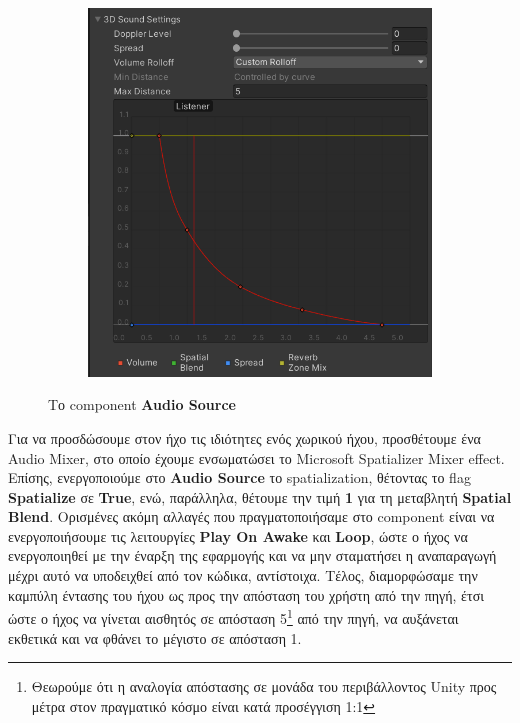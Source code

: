 \begin{figure}[!h]
\begin{subfigure}{0.5\textwidth}
        \includegraphics[width=0.8\linewidth]{images/develop_AudioSourceTwo.png}
        \caption{}
    \end{subfigure}%
    \caption{Το component \textbf{Audio Source}}\label{fig:developAudioSource}
\end{figure}

Για να προσδώσουμε στον ήχο τις ιδιότητες ενός χωρικού ήχου, προσθέτουμε ένα Audio Mixer, στο οποίο έχουμε ενσωματώσει το Microsoft Spatializer Mixer effect. Επίσης, ενεργοποιούμε στο \textbf{Audio Source} το spatialization, θέτοντας το flag \textbf{Spatialize} σε \textbf{True}, ενώ, παράλληλα, θέτουμε την τιμή \textbf{1} για τη μεταβλητή \textbf{Spatial Blend}. Ορισμένες ακόμη αλλαγές που πραγματοποιήσαμε στο component είναι να ενεργοποιήσουμε τις λειτουργίες \textbf{Play On Awake} και \textbf{Loop}, ώστε ο ήχος να ενεργοποιηθεί με την έναρξη της εφαρμογής και να μην σταματήσει η αναπαραγωγή μέχρι αυτό να υποδειχθεί από τον κώδικα, αντίστοιχα. Τέλος, διαμορφώσαμε την καμπύλη έντασης του ήχου ως προς την απόσταση του χρήστη από την πηγή, έτσι ώστε ο ήχος να γίνεται αισθητός σε απόσταση 5\footnote{Θεωρούμε ότι η αναλογία απόστασης σε μονάδα του περιβάλλοντος Unity προς μέτρα στον πραγματικό κόσμο είναι κατά προσέγγιση 1:1} από την πηγή, να αυξάνεται εκθετικά και να φθάνει το μέγιστο σε απόσταση 1.

